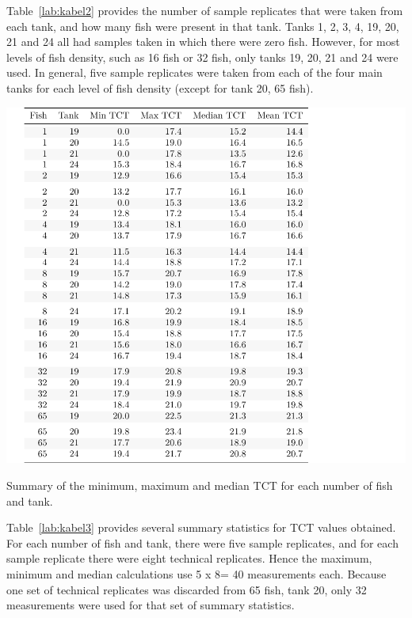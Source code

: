Table~\ref{lab:kabel2} provides the number of sample replicates that were taken from each tank, and how many fish were present in that tank. Tanks 1, 2, 3, 4, 19, 20, 21 and 24 all had samples taken in which there were zero fish. However, for most levels of fish density, such as 16 fish or 32 fish, only tanks 19, 20, 21 and 24 were used. In general, five sample replicates were taken from each of the four main tanks for each level of fish density (except for tank 20, 65 fish).

\begin{table}[H]
\includegraphics{Chapter3Images/kable3fixed2.pdf}
\caption{ Summary of the minimum, maximum and median TCT for each number of fish and tank.}
\label{lab:kabel3}
\end{table}

Table~\ref{lab:kabel3} provides several summary statistics for TCT values obtained. For each number of fish and tank, there were five sample replicates, and for each sample replicate there were eight technical replicates. Hence the maximum, minimum and median calculations use 5 x 8= 40 measurements each. Because one set of technical replicates was discarded from 65 fish, tank 20, only 32 measurements were used for that set of summary statistics.



